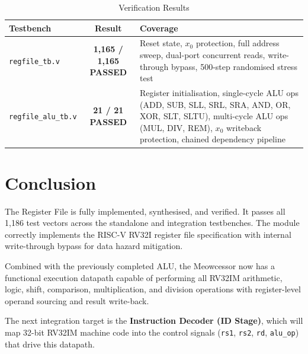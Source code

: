 \documentclass[12pt,a4paper]{article}
\begin{document}
\begin{table}[H]
    \centering
    \begin{tabularx}{\textwidth}{@{} l c X @{}}
        \toprule
        \textbf{Testbench} & \textbf{Result} & \textbf{Coverage} \\
        \midrule
        \texttt{regfile\_tb.v} & \textbf{1,165 / 1,165 PASSED} & Reset state, $x_0$ protection, full address sweep, dual-port concurrent reads, write-through bypass, 500-step randomised stress test \\
        \addlinespace
        \texttt{regfile\_alu\_tb.v} & \textbf{21 / 21 PASSED} & Register initialisation, single-cycle ALU ops (ADD, SUB, SLL, SRL, SRA, AND, OR, XOR, SLT, SLTU), multi-cycle ALU ops (MUL, DIV, REM), $x_0$ writeback protection, chained dependency pipeline \\
        \bottomrule
    \end{tabularx}
    \caption{Verification Results}
\end{table}

\section{Conclusion}

The Register File is fully implemented, synthesised, and verified. It passes all 1,186 test vectors across the standalone and integration testbenches. The module correctly implements the RISC-V RV32I register file specification with internal write-through bypass for data hazard mitigation.

Combined with the previously completed ALU, the Meowcessor now has a functional execution datapath capable of performing all RV32IM arithmetic, logic, shift, comparison, multiplication, and division operations with register-level operand sourcing and result write-back.

The next integration target is the \textbf{Instruction Decoder (ID Stage)}, which will map 32-bit RV32IM machine code into the control signals (\texttt{rs1}, \texttt{rs2}, \texttt{rd}, \texttt{alu\_op}) that drive this datapath.
\end{document}
